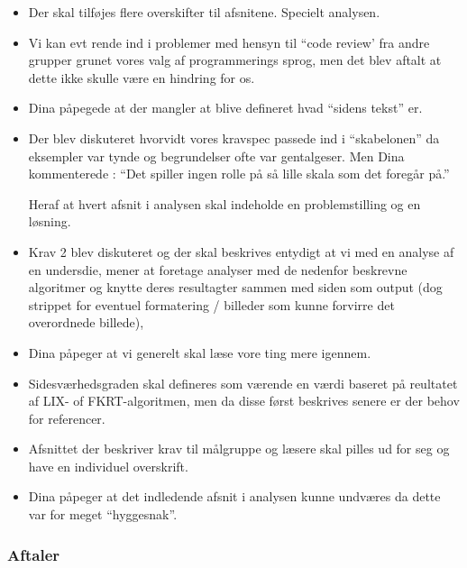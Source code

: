 \begin{itemize}

    \item Der skal tilføjes flere overskifter til afsnitene. Specielt analysen.

	\item Vi kan evt rende ind i problemer med hensyn til ``code review' fra andre grupper grunet vores valg af programmerings sprog, men det blev aftalt at dette ikke skulle være en hindring for os.

	\item Dina påpegede at der mangler at blive defineret hvad ``sidens tekst'' er.

	\item Der blev diskuteret hvorvidt vores kravspec passede ind i ``skabelonen'' da eksempler var tynde og begrundelser ofte var gentalgeser. Men Dina kommenterede : ``Det spiller ingen rolle på så lille skala som det foregår på.''

	Heraf at hvert afsnit i analysen skal indeholde en problemstilling og en løsning.

	\item Krav 2 blev diskuteret og der skal beskrives entydigt at vi med en analyse af en undersdie, mener at foretage analyser med de nedenfor beskrevne algoritmer og knytte deres resultagter sammen med siden som output (dog strippet for eventuel formatering / billeder som kunne forvirre det overordnede billede),

	\item Dina påpeger at vi generelt skal læse vore ting mere igennem.

	\item Sidesværhedsgraden skal defineres som værende en værdi baseret på reultatet af LIX- of FKRT-algoritmen, men da disse først beskrives senere er der behov for referencer.

	\item  Afsnittet der beskriver krav til målgruppe og læsere skal pilles ud for seg og have en individuel overskrift.

	\item Dina påpeger at det indledende afsnit i analysen kunne undværes da dette var for meget ``hyggesnak''.

\end{itemize}

\subsubsection{Aftaler}

